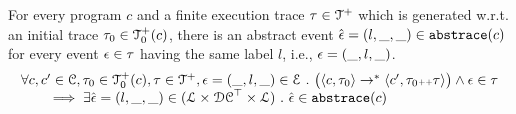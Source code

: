 \begin{lemma}
    For every program $c$ and
    a finite execution trace $\mathtt{\tau} \in \mathcal{T}^{+}$ which is generated w.r.t.
    an initial trace  $\mathtt{\tau}_0 \in \mathcal{T}^{+}_0(c)$,
    there is an abstract event $\hat{\mathtt{\epsilon}{}} = (l, \_, \_) \in \mathtt{abs}{\mathtt{trace}}(c)$ 
    for every event $\mathtt{\epsilon} \in \mathtt{\tau}$ having the same label $l$, i.e., $\mathtt{\epsilon} = (\_, l, \_)$.
    \[
    \begin{array}{l}
      \forall c, c' \in \mathcal{C}, \mathtt{\tau}_0 \in \mathcal{T}^{+}_0(c), \mathtt{\tau} \in \mathcal{T}^{+} ,  \mathtt{\epsilon} = (\_, l, \_) \in \mathcal{E} ~.~
      \big(
        \langle {c}, \mathtt{\tau}_0 \rangle \to^{*} \langle c', \mathtt{\tau}_0 {\scriptscriptstyle ++} \mathtt{\tau} \rangle 
      \big)
      \land \mathtt{\epsilon} \in \mathtt{\tau} 
      \\
      \qquad \implies \exists \hat{\mathtt{\epsilon}{}} = (l, \_, \_) \in (\mathcal{L}\times \mathcal{DC}^{\top} \times \mathcal{L}) ~.~ 
      \hat{\mathtt{\epsilon}{}} \in \mathtt{abs}{\mathtt{trace}}(c)
    \end{array}
    \]
  \end{lemma}
